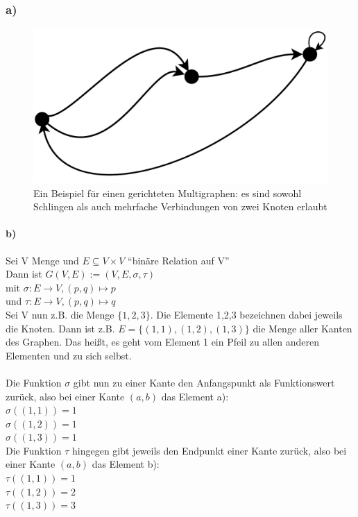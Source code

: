\subsubsection*{a)}
\begin{figure}[H]
  \begin{center}
  \includegraphics[scale=0.5,keepaspectratio=true]{../bilder/multigraph_bsp.pdf}
 \end{center}
 \caption{Ein Beispiel für einen gerichteten Multigraphen: es sind sowohl Schlingen als auch mehrfache Verbindungen von zwei Knoten erlaubt}
\end{figure}

\paragraph{b)}
Sei V Menge und $E \subseteq V \times V $ ``binäre Relation auf V''
\\Dann ist $G(V,E) := (V,E, \sigma, \tau) $
\\mit $\sigma : E \rightarrow V, (p,q) \mapsto p$
\\und $\tau : E \rightarrow V, (p,q) \mapsto q$
\\Sei V nun z.B. die Menge $\{1,2,3\}$. Die Elemente 1,2,3 bezeichnen dabei jeweils die Knoten.
Dann ist z.B. $E = \{(1,1), (1,2), (1,3)\}$ die Menge aller Kanten des Graphen. Das heißt, es geht vom Element 1 ein Pfeil zu allen anderen Elementen und zu sich selbst.
\\\\Die Funktion $\sigma$ gibt nun zu einer Kante den Anfangspunkt als Funktionswert zurück, also bei einer Kante $(a,b)$ das Element a):
\\$\sigma((1,1)) = 1$ 
\\$\sigma((1,2)) = 1$ 
\\$\sigma((1,3)) = 1$ 
\\Die Funktion $\tau$ hingegen gibt jeweils den Endpunkt einer Kante zurück, also bei einer Kante $(a,b)$ das Element b):
\\$\tau((1,1)) = 1$ 
\\$\tau((1,2)) = 2$ 
\\$\tau((1,3)) = 3$ 


